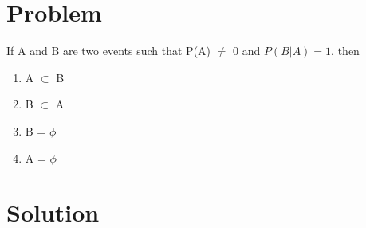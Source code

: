 \documentclass[journal,12pt,twocolumn]{IEEEtran}
\begin{document}
\section{Problem}
If A and B are two events such that P(A) $\neq$ 0
and $P(B|A) = 1$, then 
\begin{enumerate}[label={\Alph*)}]
    \item A $\subset$ B
    \item B $\subset$ A
    \item B = $\phi$ 
     \item A = $\phi$ 

\end{enumerate}
\section{Solution}
\end{document}
